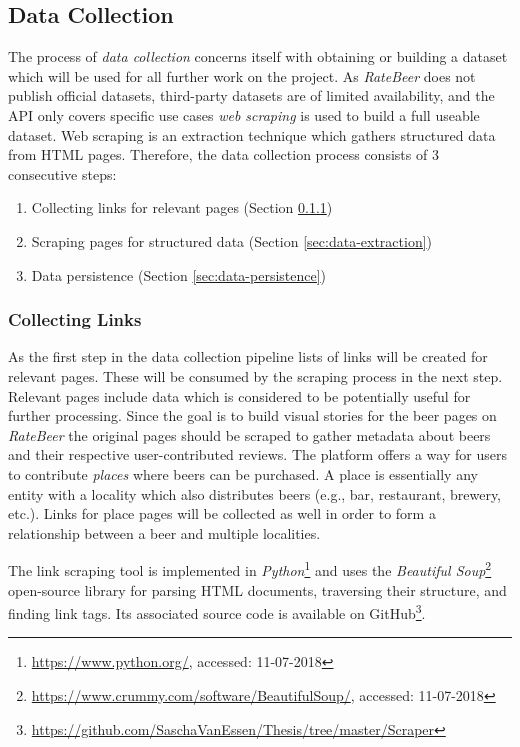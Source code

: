 \subsection{Data Collection} \label{sec:data-collection}
The process of \textit{data collection} concerns itself with obtaining or building a dataset which will be used for all further work on the project.
As \textit{RateBeer} does not publish official datasets, third-party datasets are of limited availability, and the API only covers specific use cases \textit{web scraping} is used to build a full useable dataset.
Web scraping is an extraction technique which gathers structured data from HTML pages.
Therefore, the data collection process consists of 3 consecutive steps:
\begin{enumerate}
    \item Collecting links for relevant pages (Section \ref{sec:collecting-links})
    \item Scraping pages for structured data (Section \ref{sec:data-extraction})
    \item Data persistence (Section \ref{sec:data-persistence})
\end{enumerate}


\subsubsection{Collecting Links} \label{sec:collecting-links}
As the first step in the data collection pipeline lists of links will be created for relevant pages.
These will be consumed by the scraping process in the next step.
Relevant pages include data which is considered to be potentially useful for further processing.
Since the goal is to build visual stories for the beer pages on \textit{RateBeer} the original pages should be scraped to gather metadata about beers and their respective user-contributed reviews.
The platform offers a way for users to contribute \textit{places} where beers can be purchased.
A place is essentially any entity with a locality which also distributes beers (e.g., bar, restaurant, brewery, etc.).
Links for place pages will be collected as well in order to form a relationship between a beer and multiple localities.

The link scraping tool is implemented in \textit{Python}\footnote{\url{https://www.python.org/}, accessed: 11-07-2018} and uses the \textit{Beautiful Soup}\footnote{\url{https://www.crummy.com/software/BeautifulSoup/}, accessed: 11-07-2018} open-source library for parsing HTML documents, traversing their structure, and finding link tags.
Its associated source code is available on GitHub\footnote{\url{https://github.com/SaschaVanEssen/Thesis/tree/master/Scraper}}.


